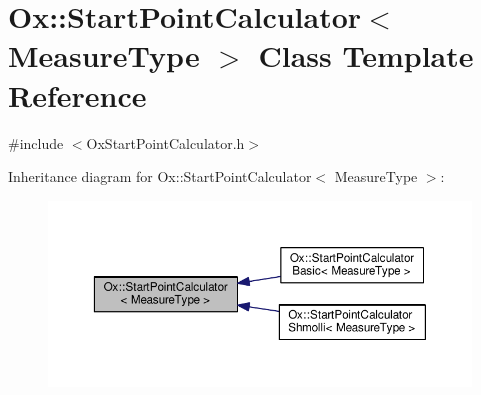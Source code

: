 \hypertarget{class_ox_1_1_start_point_calculator}{}\section{Ox\+:\+:Start\+Point\+Calculator$<$ Measure\+Type $>$ Class Template Reference}
\label{class_ox_1_1_start_point_calculator}


{\ttfamily \#include $<$Ox\+Start\+Point\+Calculator.\+h$>$}



Inheritance diagram for Ox\+:\+:Start\+Point\+Calculator$<$ Measure\+Type $>$\+:
\nopagebreak
\begin{figure}[H]
\begin{center}
\leavevmode
\includegraphics[width=350pt]{class_ox_1_1_start_point_calculator__inherit__graph}
\end{center}
\end{figure}
